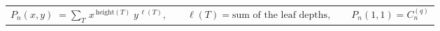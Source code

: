 \documentclass[12pt,border=4pt]{standalone}
\begin{document}
\color[HTML]{1F2A3A}
\begin{tabular}{@{}c@{}}$\displaystyle P_n(x,y)\;=\sum_{T}\,x^{\,\mathrm{height}(T)}\;y^{\,\ell(T)},\qquad \ell(T)=\text{sum of the leaf depths},\qquad P_n(1,1)=C^{(q)}_n$\end{tabular}
\end{document}
